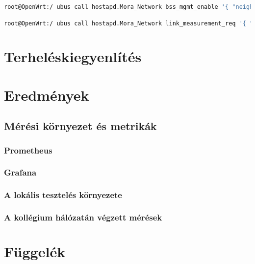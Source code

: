 \documentclass[12pt]{article}
\begin{document}
\begin{lstlisting}[language=Bash]
  root@OpenWrt:/ ubus call hostapd.Mora_Network bss_mgmt_enable '{ "neighbor_report": true, "beacon_report": true, "link_measurements": true, "bss_transition": true }'
\end{lstlisting}

\begin{lstlisting}[language=Bash]
  root@OpenWrt:/ ubus call hostapd.Mora_Network link_measurement_req '{ "addr": "FE:ED:AD:BE:EE" }'
\end{lstlisting}


\section{Terheléskiegyenlítés}

\section{Eredmények}

\subsection{Mérési környezet és metrikák}

\subsubsection{Prometheus}

\subsubsection{Grafana}

\subsubsection{A lokális tesztelés környezete}

\subsubsection{A kollégium hálózatán végzett mérések}




\newpage

\section*{Függelék}
\end{document}
